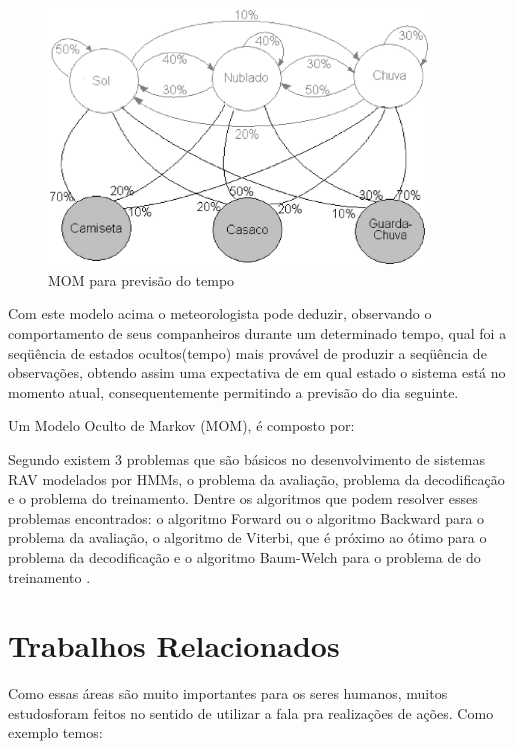 \begin{figure}[H]
\includegraphics[width=0.9\textwidth]{graficos/markov_2.eps}
\caption{MOM para previsão do tempo}
\label{Modelos Ocultos de Markov}
\end{figure}

Com este modelo acima o meteorologista pode deduzir, observando o comportamento de seus companheiros durante um determinado tempo, qual foi a seqüência de estados ocultos(tempo) mais provável de produzir a seqüência de observações, obtendo assim uma expectativa de em qual estado o sistema está no momento atual, consequentemente permitindo a previsão do dia seguinte. 

Um Modelo Oculto de Markov (MOM), é composto por:





Segundo  existem 3 problemas que são básicos no desenvolvimento de sistemas RAV modelados por HMMs, o problema da avaliação, problema da decodificação e o problema do treinamento. Dentre os algoritmos que podem resolver esses problemas encontrados: o algoritmo Forward ou o algoritmo Backward para o problema da avaliação, o algoritmo de Viterbi, que é próximo ao ótimo para o problema da decodificação e o algoritmo Baum-Welch para o problema de do treinamento \cite{RavIsolAnderson}.


\section{Trabalhos Relacionados}

Como essas áreas são muito importantes para os seres humanos, muitos estudosforam feitos no sentido de utilizar a fala pra realizações de ações. Como exemplo temos:

